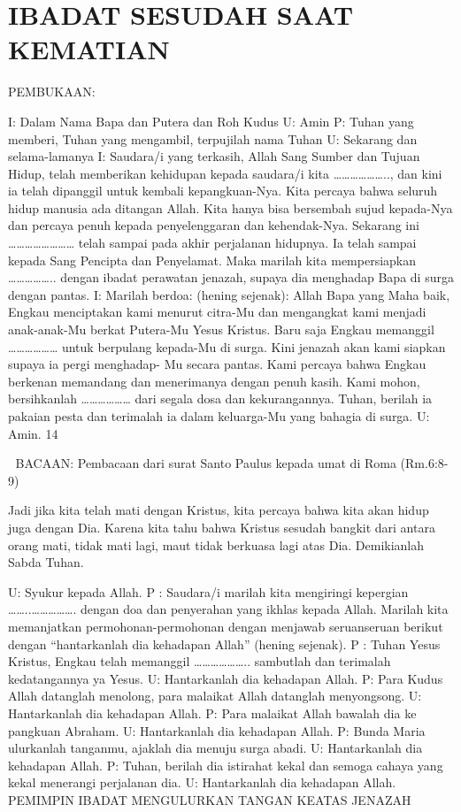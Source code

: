 \documentclass[10pt,a5paper,fancyhdr]{memoir}
\begin{document}

\chapter{IBADAT SESUDAH SAAT KEMATIAN} 

PEMBUKAAN: 

I: Dalam Nama Bapa dan Putera dan Roh Kudus 
U: Amin 
P: Tuhan yang memberi, Tuhan yang mengambil, terpujilah 
nama Tuhan 
U: Sekarang dan selama-lamanya 
I: Saudara/i yang terkasih, Allah Sang Sumber dan Tujuan Hidup, 
telah memberikan kehidupan kepada saudara/i kita ……………….., 
dan kini ia telah dipanggil untuk kembali kepangkuan-Nya. Kita 
percaya bahwa seluruh hidup manusia ada ditangan Allah. Kita hanya 
bisa bersembah sujud kepada-Nya dan percaya penuh kepada 
penyelenggaran dan kehendak-Nya. Sekarang ini …………………… 
telah sampai pada akhir perjalanan hidupnya. Ia telah sampai kepada 
Sang Pencipta dan Penyelamat. Maka marilah kita mempersiapkan 
…………….. dengan ibadat perawatan jenazah, supaya dia 
menghadap Bapa di surga dengan pantas. 
I: Marilah berdoa: (hening sejenak): Allah Bapa yang Maha baik, 
Engkau menciptakan kami menurut citra-Mu dan mengangkat kami 
menjadi anak-anak-Mu berkat Putera-Mu Yesus Kristus. Baru saja 
Engkau memanggil ……………… untuk berpulang kepada-Mu di 
surga. Kini jenazah akan kami siapkan supaya ia pergi menghadap-
Mu secara pantas. Kami percaya bahwa Engkau berkenan 
memandang dan menerimanya dengan penuh kasih. Kami mohon, 
bersihkanlah ……………… dari segala dosa dan kekurangannya. 
Tuhan, berilah ia pakaian pesta dan terimalah ia dalam keluarga-Mu 
yang bahagia di surga. 
U: Amin. 
14 



BACAAN: Pembacaan dari surat Santo Paulus kepada umat di Roma 
(Rm.6:8-9) 

Jadi jika kita telah mati dengan Kristus, kita percaya bahwa kita akan 
hidup juga dengan Dia. Karena kita tahu bahwa Kristus sesudah 
bangkit dari antara orang mati, tidak mati lagi, maut tidak berkuasa 
lagi atas Dia. Demikianlah Sabda Tuhan. 

U: Syukur kepada Allah. 
P : Saudara/i marilah kita mengiringi kepergian ……..……………. 
dengan doa dan penyerahan yang ikhlas kepada Allah. Marilah kita 
memanjatkan permohonan-permohonan dengan menjawab seruanseruan 
berikut dengan “hantarkanlah dia kehadapan Allah” (hening 
sejenak). 
P : Tuhan Yesus Kristus, Engkau telah memanggil ……………….. 
sambutlah dan terimalah kedatangannya ya Yesus. 
U: Hantarkanlah dia kehadapan Allah. 
P: Para Kudus Allah datanglah menolong, para malaikat Allah 
datanglah menyongsong. 
U: Hantarkanlah dia kehadapan Allah. 
P: Para malaikat Allah bawalah dia ke pangkuan Abraham. 
U: Hantarkanlah dia kehadapan Allah. 
P: Bunda Maria ulurkanlah tanganmu, ajaklah dia menuju 
surga abadi. 
U: Hantarkanlah dia kehadapan Allah. 
P: Tuhan, berilah dia istirahat kekal dan semoga cahaya 
yang kekal menerangi perjalanan dia. 
U: Hantarkanlah dia kehadapan Allah. 
PEMIMPIN IBADAT MENGULURKAN TANGAN KEATAS 
JENAZAH 
\end{document}
